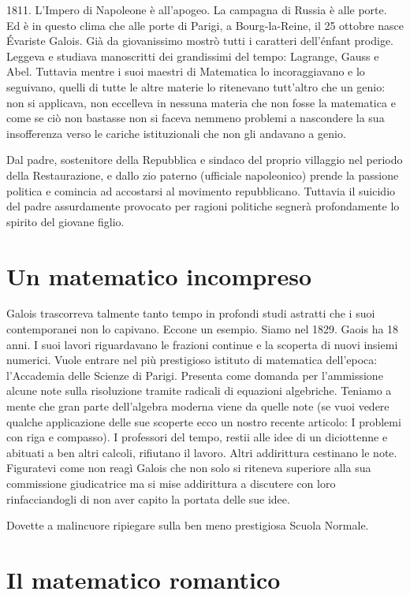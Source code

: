 1811. L’Impero di Napoleone è all’apogeo. La campagna di Russia è alle porte. Ed è in questo clima che alle porte di Parigi, a Bourg-la-Reine, il 25 ottobre nasce Évariste Galois. Già da giovanissimo mostrò tutti i caratteri dell’énfant prodige. Leggeva e studiava manoscritti dei grandissimi del tempo: Lagrange, Gauss e Abel. Tuttavia mentre i suoi maestri di Matematica lo incoraggiavano e lo seguivano, quelli di tutte le altre materie lo ritenevano tutt’altro che un genio: non si applicava, non eccelleva in nessuna materia che non fosse la matematica e come se ciò non bastasse non si faceva nemmeno problemi a nascondere la sua insofferenza verso le cariche istituzionali che non gli andavano a genio.

Dal padre, sostenitore della Repubblica e sindaco del proprio villaggio nel periodo della Restaurazione, e dallo zio paterno (ufficiale napoleonico) prende la passione politica e comincia ad accostarsi al movimento repubblicano. Tuttavia il suicidio del padre assurdamente provocato per ragioni politiche segnerà profondamente lo spirito del giovane figlio.
\section{Un matematico incompreso}

Galois trascorreva talmente tanto tempo in profondi studi astratti che i suoi contemporanei non lo capivano. Eccone un esempio. Siamo nel 1829. Gaois ha 18 anni. I suoi lavori riguardavano le frazioni continue e la scoperta di nuovi insiemi numerici. Vuole entrare nel più prestigioso istituto di matematica dell’epoca: l’Accademia delle Scienze di Parigi. Presenta come domanda per l’ammissione alcune note sulla risoluzione tramite radicali di equazioni algebriche. Teniamo a mente che gran parte dell’algebra moderna viene da quelle note (se vuoi vedere qualche applicazione delle sue scoperte ecco un nostro recente articolo: I problemi con riga e compasso). I professori del tempo, restii alle idee di un diciottenne e abituati a ben altri calcoli, rifiutano il lavoro. Altri addirittura cestinano le note. Figuratevi come non reagì Galois che non solo si riteneva superiore alla sua commissione giudicatrice ma si mise addirittura a discutere con loro rinfacciandogli di non aver capito la portata delle sue idee.

Dovette a malincuore ripiegare sulla ben meno prestigiosa Scuola Normale.
\section{Il matematico romantico}

